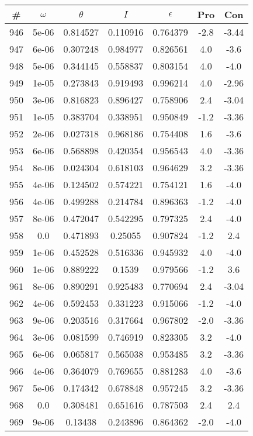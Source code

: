 \begin{table}
\begin{tabular}{c|c|c|c|c|c|c}
\# & $\omega$ & $\theta$ & $I$ & $\epsilon$ & Pro & Con\\
\hline
946 & 5e-06 & 0.814527 & 0.110916 & 0.764379 & -2.8 & -3.44\\
947 & 6e-06 & 0.307248 & 0.984977 & 0.826561 & 4.0 & -3.6\\
948 & 5e-06 & 0.344145 & 0.558837 & 0.803154 & 4.0 & -4.0\\
949 & 1e-05 & 0.273843 & 0.919493 & 0.996214 & 4.0 & -2.96\\
950 & 3e-06 & 0.816823 & 0.896427 & 0.758906 & 2.4 & -3.04\\
951 & 1e-05 & 0.383704 & 0.338951 & 0.950849 & -1.2 & -3.36\\
952 & 2e-06 & 0.027318 & 0.968186 & 0.754408 & 1.6 & -3.6\\
953 & 6e-06 & 0.568898 & 0.420354 & 0.956543 & 4.0 & -3.36\\
954 & 8e-06 & 0.024304 & 0.618103 & 0.964629 & 3.2 & -3.36\\
955 & 4e-06 & 0.124502 & 0.574221 & 0.754121 & 1.6 & -4.0\\
956 & 4e-06 & 0.499288 & 0.214784 & 0.896363 & -1.2 & -4.0\\
957 & 8e-06 & 0.472047 & 0.542295 & 0.797325 & 2.4 & -4.0\\
958 & 0.0 & 0.471893 & 0.25055 & 0.907824 & -1.2 & 2.4\\
959 & 1e-06 & 0.452528 & 0.516336 & 0.945932 & 4.0 & -4.0\\
960 & 1e-06 & 0.889222 & 0.1539 & 0.979566 & -1.2 & 3.6\\
961 & 8e-06 & 0.890291 & 0.925483 & 0.770694 & 2.4 & -3.04\\
962 & 4e-06 & 0.592453 & 0.331223 & 0.915066 & -1.2 & -4.0\\
963 & 9e-06 & 0.203516 & 0.317664 & 0.967802 & -2.0 & -3.36\\
964 & 3e-06 & 0.081599 & 0.746919 & 0.823305 & 3.2 & -4.0\\
965 & 6e-06 & 0.065817 & 0.565038 & 0.953485 & 3.2 & -3.36\\
966 & 4e-06 & 0.364079 & 0.769655 & 0.881283 & 4.0 & -3.6\\
967 & 5e-06 & 0.174342 & 0.678848 & 0.957245 & 3.2 & -3.36\\
968 & 0.0 & 0.308481 & 0.651616 & 0.787503 & 2.4 & 2.4\\
969 & 9e-06 & 0.13438 & 0.243896 & 0.864362 & -2.0 & -4.0\\

\end{tabular}
\end{table}
